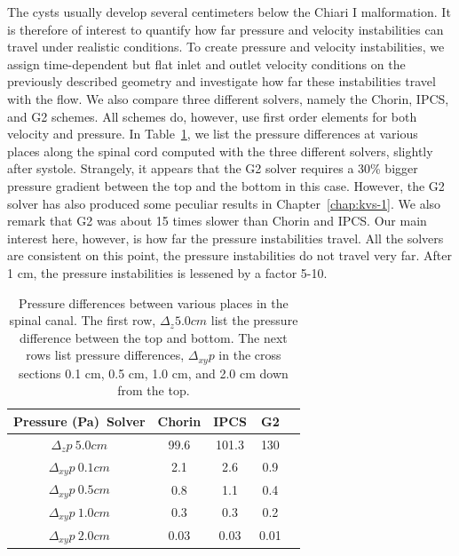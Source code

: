The cysts usually develop several centimeters below the Chiari I
malformation. It is therefore of interest to quantify how far pressure
and velocity instabilities can travel under realistic conditions.  To
create pressure and velocity instabilities, we assign time-dependent
but flat inlet and outlet velocity conditions on the previously
described geometry and investigate how far these instabilities travel
with the flow. We also compare three different solvers, namely the
Chorin, IPCS, and G2 schemes.  All schemes do, however, use first
order elements for both velocity and pressure. In
Table~\ref{solvers:pressurediff}, we list the pressure differences at
various places along the spinal cord computed with the three different
solvers, slightly after systole. Strangely, it appears that the G2
solver requires a 30\% bigger pressure gradient between the top and
the bottom in this case. However, the G2 solver has also produced some
peculiar results in Chapter~\ref{chap:kvs-1}. We also remark that G2
was about 15 times slower than Chorin and IPCS. Our main interest
here, however, is how far the pressure instabilities travel. All the
solvers are consistent on this point, the pressure instabilities do
not travel very far. After 1 cm, the pressure instabilities is
lessened by a factor 5-10.

\begin{table}
\begin{center}
\begin{tabular}{|c|c|c|c|c|} \hline
Pressure (Pa)\ Solver & Chorin & IPCS & G2 \\ \hline
$\Delta_z p \ 5.0 cm$  & 99.6 & 101.3 & 130     \\ \hline
$\Delta_{xy} p  \ 0.1 cm$  &  2.1 & 2.6 & 0.9     \\ \hline
$\Delta_{xy}  p  \ 0.5 cm$  & 0.8 & 1.1 & 0.4     \\ \hline
$\Delta_{xy}  p  \ 1.0 cm$  & 0.3 & 0.3 & 0.2     \\ \hline
$\Delta_{xy}  p  \ 2.0 cm$  &  0.03 & 0.03 & 0.01     \\ \hline
\end{tabular}
\label{solvers:pressurediff}
\caption{Pressure differences between various places in the spinal canal.
The first row, $\Delta_z 5.0 cm$ list the pressure difference between the top
and bottom. The next rows list pressure differences, $\Delta_{xy}  p$ in
the cross sections 0.1 cm, 0.5 cm, 1.0 cm, and 2.0 cm down from the top. }
\end{center}
\end{table}

